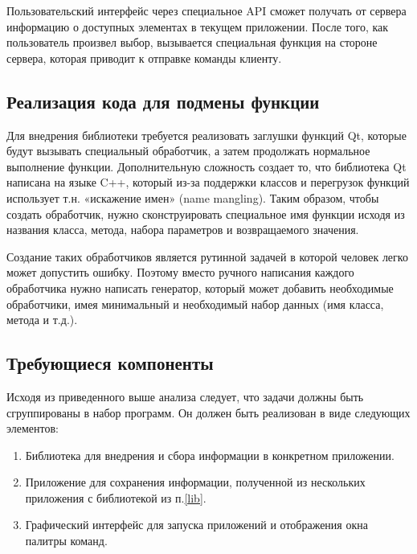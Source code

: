 Пользовательский интерфейс через специальное API сможет получать от сервера
информацию о доступных элементах в текущем приложении. После того, как
пользователь произвел выбор, вызывается специальная функция на стороне сервера,
которая приводит к отправке команды клиенту.

\subsection{Реализация кода для подмены функции}

Для внедрения библиотеки требуется реализовать заглушки функций Qt, которые
будут вызывать специальный обработчик, а затем продолжать нормальное выполнение
функции. Дополнительную сложность создает то, что библиотека Qt написана на
языке C++, который из-за поддержки классов и перегрузок функций использует т.н.
«искажение имен» (name mangling). Таким образом, чтобы создать обработчик,
нужно сконструировать специальное имя функции исходя из названия класса,
метода, набора параметров и возвращаемого значения.

Создание таких обработчиков является рутинной задачей в которой человек легко
может допустить ошибку. Поэтому вместо ручного написания каждого обработчика
нужно написать генератор, который может добавить необходимые обработчики, имея
минимальный и необходимый набор данных (имя класса, метода и т.д.).

\subsection{Требующиеся компоненты}

Исходя из приведенного выше анализа следует, что задачи должны быть сгруппированы
в набор программ. Он должен быть реализован в виде следующих элементов:

\begin{enumerate}
	\item\label{lib} Библиотека для внедрения и сбора информации в конкретном
	приложении.
	\item Приложение для сохранения информации, полученной из нескольких
	приложения с библиотекой из п.\ref{lib}.
	\item Графический интерфейс для запуска приложений и отображения окна
	палитры команд.
\end{enumerate}


